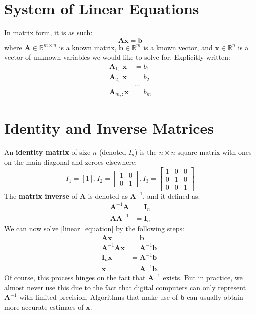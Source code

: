 \documentclass[11pt,twocolumn]{report}
\def\realnumbers{\mathbb{R}}
\begin{document}
\section{System of Linear Equations}
In matrix form, it is as such:
\begin{equation}
  \label{linear_equation}
  \bm{Ax} = \bm{b}
\end{equation}
where $\bm{A} \in \realnumbers^{m \times n}$ is a known matrix, $\bm{b} \in
\realnumbers^m$ is a known vector, and $\bm{x} \in \realnumbers^n$ is a vector
of unknown variables we would like to solve for. Explicitly written:
\begin{align}
  \bm{A}_{1, :}\bm{x} & = b_1\\
  \bm{A}_{2, :}\bm{x} & = b_2\\
  & \hdots\\
  \bm{A}_{m, :}\bm{x} & = b_m
\end{align}

\section{Identity and Inverse Matrices}
An \textbf{identity matrix} of size $n$ (denoted $I_n$)
is the $n \times n$ square matrix with ones on the main diagonal and
zeroes elsewhere:
\begin{equation*}
  I_1 = [1],
  I_2 = \begin{bmatrix}
    1 & 0\\
    0 & 1
  \end{bmatrix},
  I_3 = \begin{bmatrix}
    1 & 0 & 0\\
    0 & 1 & 0\\
    0 & 0 & 1
  \end{bmatrix}
\end{equation*}
The \textbf{matrix inverse} of $\bm{A}$ is denoted as $\bm{A}^{-1}$, and it defined as:
\begin{align}
  \bm{A}^{-1}\bm{A} & = \bm{I}_n\\
  \bm{A}\bm{A}^{-1} & = \bm{I}_n
\end{align}
We can now solve \ref{linear_equation} by the following steps:
\begin{align}
  \bm{Ax} & = \bm{b}\\
  \bm{A}^{-1}\bm{Ax} & = \bm{A}^{-1}\bm{b}\\
  \bm{I}_n\bm{x} & = \bm{A}^{-1}\bm{b}\\
  \bm{x} & = \bm{A}^{-1}\bm{b}.
\end{align}
Of course, this process hinges on the fact that $\bm{A}^{-1}$ exists.
But in practice, we almost never use this due to the fact that digital
computers can only represent $\bm{A}^{-1}$ with limited precision. Algorithms
that make use of $\bm{b}$ can usually obtain more accurate estimaes of
$\bm{x}$.
\end{document}
